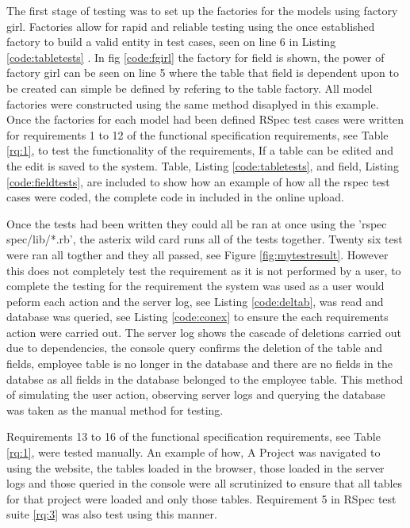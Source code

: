 \documentclass[a4paper,12pt]{article}
\begin{document}
\par The first stage of testing was to set up the factories for the models using factory girl\cite{fgirl}. Factories allow for rapid and reliable testing using the once established factory to build a valid entity in test cases, seen on line 6 in Listing \ref{code:tabletests} . In fig \ref{code:fgirl} the factory for field is shown, the power of factory girl can be seen on line 5 where the table that field is dependent upon to be created can simple be defined by refering to the table factory. All model factories were constructed using the same method disaplyed in this example. Once the factories for each model had been defined RSpec test cases were written for requirements 1 to 12 of the functional specification requirements, see Table \ref{rq:1}, to test the functionality of the requirements, If a table can be edited and the edit is saved to the system. Table,  Listing \ref{code:tabletests}, and field, Listing \ref{code:fieldtests}, are included to show how an example of how all the rspec test cases were coded, the complete code in included in the online upload.
\par Once the tests had been written they could all be ran at once using the 'rspec spec/lib/*.rb', the asterix wild card runs all of the tests together. Twenty six test were ran all togther and they all passed, see Figure \ref{fig:mytestresult}. However this does not completely test the requirement as it is not performed by a user, to complete the testing for the requirement the system was used as a user would peform each action and the server log, see Listing \ref{code:deltab}, was read and database was queried, see Listing \ref{code:conex} to ensure the each requirements action were carried out. The server log shows the cascade of deletions carried out due to dependencies, the console query confirms the deletion of the table and fields, employee table is no longer in the database and there are no fields in the databse as all fields in the database belonged to the employee table. This method of simulating the user action, observing server logs and querying the database was taken as the manual method for testing.
\par  Requirements 13 to 16 of the functional specification requirements, see Table \ref{rq:1}, were tested manually. An example of how, A Project was navigated to using the website, the tables loaded in the browser, those loaded in the server logs and those queried in the console were all scrutinized to ensure that all tables for that project were loaded and only those tables. Requirement 5 in RSpec test suite \ref{rq:3} was also test using this manner.
\end{document}
